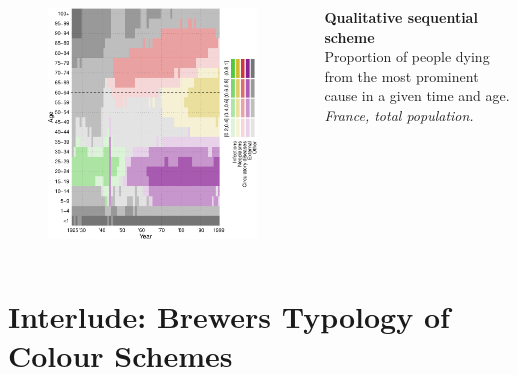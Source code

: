 \documentclass{beamer}
\begin{document}
\begin{frame}
\frametitle{\insertsection}

\begin{columns}[c]

\begin{figure}[htb!]
\includegraphics[width = 0.97\textwidth]{../fig/talk/qual_seq.pdf}
\end{figure}

\footnotesize \textbf{Qualitative sequential scheme}\\ Proportion of people dying from the most prominent cause in a given time and age. \scriptsize\emph{France, total population.}

\end{columns}

\end{frame}

\section{Interlude: Brewers Typology of Colour Schemes} %
\end{document}
